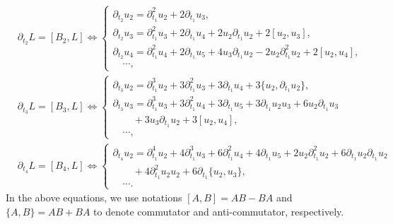 \documentclass[11p,reqno]{amsart}
\numberwithin{equation}{section}
\numberwithin{equation}{section}
\begin{document}
\begin{subequations}
\begin{align}  \label{m=2}
  &  \partial_{t_2} L = \left[B_2, L\right] \Leftrightarrow
    \left\{
    \begin{array}{l}
        \partial_{t_2} u_2 = \partial_{t_1}^2 u_2 + 2\partial_{t_1} u_3, \\
        \partial_{t_2} u_3 = \partial_{t_1}^2 u_3 + 2\partial_{t_1} u_4 + 2 u_2 \partial_{t_1} u_2 + 2 \left[u_2, u_3\right], \\
        \partial_{t_2} u_4 = \partial_{t_1}^2 u_4 + 2\partial_{t_1} u_5 + 4 u_3 \partial_{t_1} u_2 - 2 u_2 \partial_{t_1}^2 u_2 + 2 \left[u_2, u_4\right], \\
        \quad \cdots,
    \end{array}
    \right.\\
  \label{m=3}
  &  \partial_{t_3} L = \left[B_3, L\right] \Leftrightarrow
    \left\{
    \begin{array}{l}
        \partial_{t_3} u_2 = \partial_{t_1}^3 u_2 + 3\partial_{t_1}^2 u_3 + 3\partial_{t_1} u_4 + 3\{u_2, \partial_{t_1} u_2\}, \\
        \partial_{t_3} u_3 = \partial_{t_1}^3 u_3 + 3\partial_{t_1}^2 u_4 + 3\partial_{t_1} u_5 + 3\partial_{t_1} u_2 u_3 + 6 u_2 \partial_{t_1} u_3 \\
        \quad\quad + 3 u_3 \partial_{t_1} u_2 + 3 [u_2, u_4], \\
        \quad \cdots,
    \end{array}
    \right.\\
      \label{m=4}
    &\partial_{t_4} L = \left[B_4, L\right] \Leftrightarrow
    \left\{
    \begin{array}{l}
        \partial_{t_4} u_2 = \partial_{t_1}^4 u_2 + 4\partial_{t_1}^3 u_3 + 6\partial_{t_1}^2 u_4 + 4\partial_{t_1} u_5 + 2 u_2 \partial_{t_1}^2 u_2 + 6\partial_{t_1} u_2 \partial_{t_1} u_2 \\
        \quad\quad + 4\partial_{t_1}^2 u_2 u_2 + 6\partial_{t_1} \{u_2, u_3\}, \\
        \quad \cdots.
    \end{array}
    \right.
\end{align}
\end{subequations}
In the above equations, we use notations $[A, B] = AB - BA$ and $\{A, B\} = AB + BA$ to denote commutator and anti-commutator, respectively.
\end{document}

